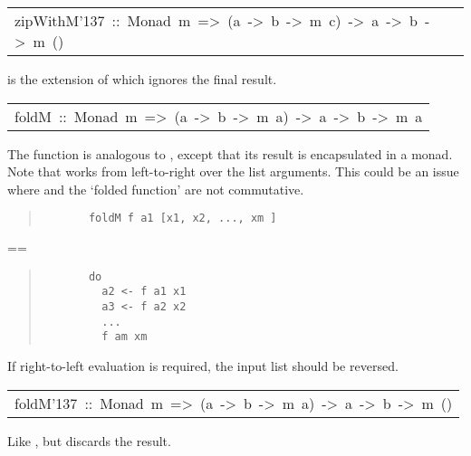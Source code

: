 \begin{haddockdesc}
\item[\begin{tabular}{@{}l}
zipWithM{\char '137}\ ::\ Monad\ m\ =>\ (a\ ->\ b\ ->\ m\ c)\ ->\ {\char 91}a{\char 93}\ ->\ {\char 91}b{\char 93}\ ->\ m\ ()
\end{tabular}]\haddockbegindoc
{} is the extension of  which ignores the final result.
\par

\end{haddockdesc}
\begin{haddockdesc}
\item[\begin{tabular}{@{}l}
foldM\ ::\ Monad\ m\ =>\ (a\ ->\ b\ ->\ m\ a)\ ->\ a\ ->\ {\char 91}b{\char 93}\ ->\ m\ a
\end{tabular}]\haddockbegindoc
The  function is analogous to , except that its result is
encapsulated in a monad. Note that  works from left-to-right over
the list arguments. This could be an issue where \haddocktt{(>>)} and the `folded
function' are not commutative.
\par
\begin{quote}
{\haddockverb\begin{verbatim}
       foldM f a1 [x1, x2, ..., xm ]
\end{verbatim}}
\end{quote}
==  
\par
\begin{quote}
{\haddockverb\begin{verbatim}
       do
         a2 <- f a1 x1
         a3 <- f a2 x2
         ...
         f am xm
\end{verbatim}}
\end{quote}
If right-to-left evaluation is required, the input list should be reversed.
\par

\end{haddockdesc}
\begin{haddockdesc}
\item[\begin{tabular}{@{}l}
foldM{\char '137}\ ::\ Monad\ m\ =>\ (a\ ->\ b\ ->\ m\ a)\ ->\ a\ ->\ {\char 91}b{\char 93}\ ->\ m\ ()
\end{tabular}]\haddockbegindoc
Like , but discards the result.
\par

\end{haddockdesc}
